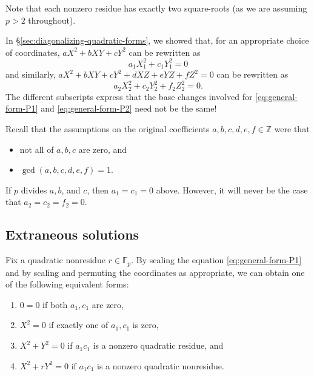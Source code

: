 \documentclass[10pt,a4paper]{amsart}
\numberwithin{equation}{section}
\numberwithin{figure}{section}
\theoremstyle{definition}
\theoremstyle{remark}
\theoremstyle{plain}
\theoremstyle{plain}
\theoremstyle{definition}
\theoremstyle{plain}
\theoremstyle{plain}
\newcommand{\F}{\mathbb{F}}
\newcommand{\Z}{\mathbb{Z}}
\begin{document}
    Note that each nonzero residue has exactly two square-roots (as we are assuming
    $p > 2$ throughout).

    In \S\ref{sec:diagonalizing-quadratic-forms}, we showed that, for an
    appropriate choice of coordinates, $aX^2 + bXY + cY^2$ can be rewritten as
    \begin{equation}\label{eq:general-form-P1} 
        a_1 X_1^2 + c_1 Y_1^2 = 0
    \end{equation} 
    and similarly, $aX^2 + bXY + cY^2 + dXZ + eYZ + fZ^2 = 0$ can be
    rewritten as 
    \begin{equation}\label{eq:general-form-P2} 
        a_2 X_2^2 + c_2 Y_2^2 + f_2 Z_2^2 = 0.
    \end{equation}
    The different subscripts express that the base
    changes involved for \eqref{eq:general-form-P1} and \eqref{eq:general-form-P2}
    need not be the same!

    Recall that the assumptions on the original coefficients 
    $a,b,c,d,e,f \in \Z$ were that 
    \begin{itemize} 
        \item not all of $a,b,c$ are zero, and
        \item $\gcd(a,b,c,d,e,f) = 1$.  
    \end{itemize} 
    If $p$ divides $a,b$, and $c$, then $a_1 = c_1 = 0$ above. However, 
    it will never be the case that $a_2 = c_2 = f_2 = 0$.

    \subsection{Extraneous solutions}
    \label{subsec:counting-P1-solutions}

    Fix a quadratic nonresidue $r \in \F_p$. By scaling the equation
    \eqref{eq:general-form-P1} and by scaling and permuting the coordinates as
    appropriate, we can obtain one of the following equivalent forms:
    \begin{enumerate} 
        \item $0 = 0$ if both $a_1, c_1$ are zero, 
        \item $X^2 = 0$ if exactly one of $a_1, c_1$ is zero, 
        \item $X^2 + Y^2 = 0$ if $a_1 c_1$ is a nonzero quadratic residue, and
        \label{case:x^2+y^2=0} \item $X^2 + rY^2 = 0$ if $a_1 c_1$ is a nonzero 
        quadratic nonresidue.  
    \end{enumerate}
\end{document}
